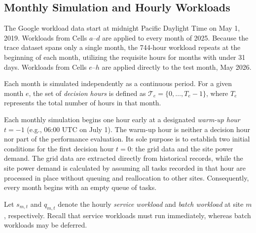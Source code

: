 \documentclass{UNCC-thesis}
\begin{document}
\subsection{Monthly Simulation and Hourly Workloads}
\label{subsec:transform-pairing}

The Google workload data start at midnight Pacific Daylight Time on May 1, 2019.
Workloads from Cells \(a\)--\(d\) are applied to every month of 2025.
Because the trace dataset spans
only a single month, the 744-hour workload repeats at the beginning of each
month, utilizing the requisite hours for months with under 31 days. Workloads from Cells
\(e\)--\(h\) are applied directly to the test month, May 2026.

Each month is simulated independently as a continuous period. For a given month
\(e\), the set of \emph{decision hours} is defined as
\(\mathcal T_e=\{0,\ldots,T_e-1\}\), where \(T_e\) represents the total number of
hours in that month.

Each monthly simulation begins one hour early at a designated \emph{warm-up hour}
\(t=-1\) (e.g., 06:00 UTC on July 1). The warm-up hour is neither a decision hour nor part of the performance evaluation. Its sole purpose is to establish two
initial conditions for the first decision hour \(t=0\): the grid data and the
site power demand. The grid data are extracted directly from historical records, while
the site power demand is calculated by assuming all tasks recorded in that hour are
processed in place without queuing and reallocation to other sites. Consequently,
every month begins with an empty queue of tasks. 

Let \(s_{m,t}\) and \(q_{m,t}\) denote the hourly \emph{service workload} and
\emph{batch workload} at site \(m\), respectively. Recall that service workloads must run
immediately, whereas batch workloads may be deferred.
\end{document}
